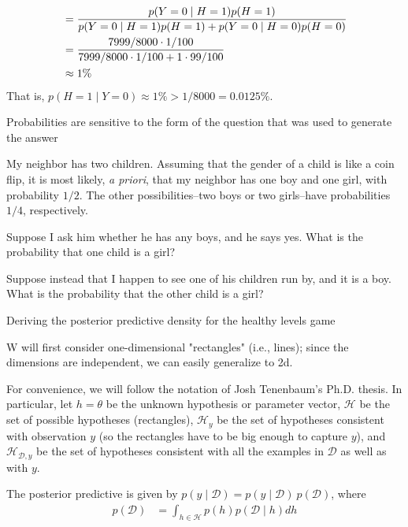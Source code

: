 \begin{exercise}
\begin{exercise}
\begin{align}
			&= \frac{p(Y = 0\mid H = 1) p(H = 1)}{p(Y = 0\mid H = 1) p(H = 1) + p(Y = 0\mid H = 0) p(H = 0)}
			\notag\\
			&= \frac{7999 / 8000\cdot 1 / 100}{7999 / 8000\cdot 1 / 100 + 1 \cdot 99 / 100}\notag\\
			&\approx 1\%\notag
		\end{align}
	That is, \(p(H = 1\mid Y = 0) \approx 1\% > 1 / 8000 = 0.0125\%\).
	\end{exercise}
\item Probabilities are sensitive to the form of the question that was used to generate the answer
	\par\smallskip
	My neighbor has two children. Assuming that the gender of a child is like a coin flip, it is most likely, 
	\textit{a priori}, that my neighbor has one boy and one girl, with probability \(1 / 2\). The other possibilities--two
	boys or two girls--have probabilities \(1 / 4\), respectively.
	\begin{exercise}
	\item
		Suppose I ask him whether he has any boys, and he says yes. What is the probability that one child is a 
		girl?
	\item
		Suppose instead that I happen to see one of his children run by, and it is a boy. What is the probability that
		the other child is a girl?
	\end{exercise}
\item Deriving the posterior predictive density for the healthy levels game
	\par\smallskip
	W will first consider one-dimensional "rectangles" (i.e., lines); since the dimensions are independent, we can
	easily generalize to 2d.
	\par\smallskip
	For convenience, we will follow the notation of Josh Tenenbaum's Ph.D. thesis. In particular, let \(h = \theta\) be
	the unknown hypothesis or parameter vector, \(\mathcal{H}\) be the set of possible hypotheses (rectangles), 
	\(\mathcal{H}_y\) be the set of hypotheses consistent with observation \(y\) (so the rectangles have to be big 
	enough to capture \(y\)), and \(\mathcal{H}_{\mathcal{D}, y}\) be the set of hypotheses consistent with all the
	examples in \(\mathcal{D}\) as well as with \(y\).
	\par\smallskip
	The posterior predictive is given by \(p(y\mid\mathcal{D}) = p(y\mid\mathcal{D}) \ p(\mathcal{D})\), where
	\begin{align}
		p(\mathcal{D}) &= \int_{h\in\mathcal{H}}p(h)p(\mathcal{D}\mid h)dh\\

\end{align}
\end{exercise}
